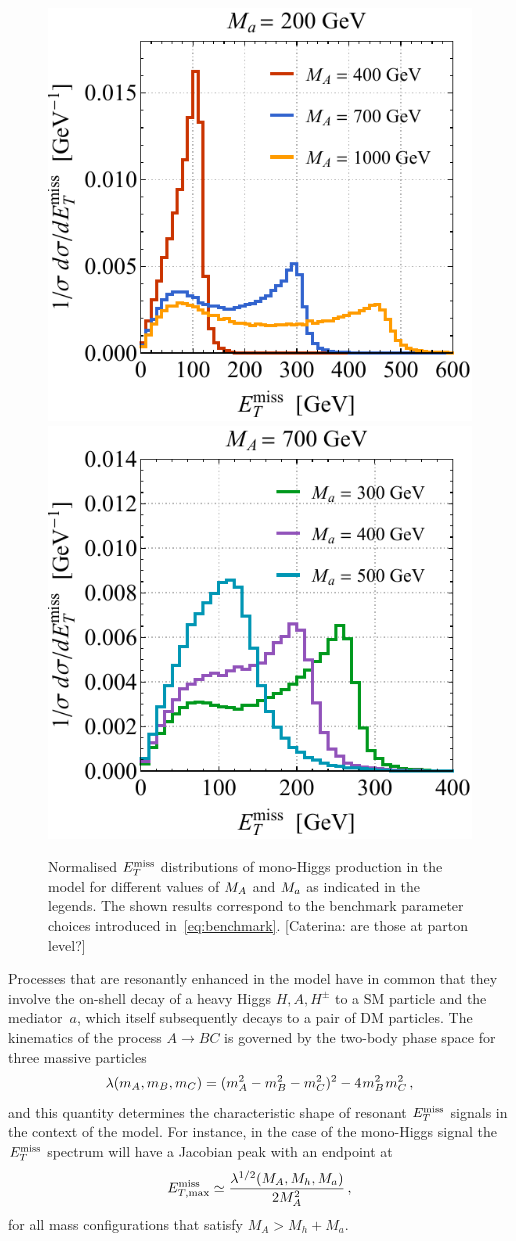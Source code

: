 \begin{figure}[t!]
\centering
\includegraphics[height=0.45\textwidth]{texinputs/04_grid/newfigures/hmetspecl.pdf}	\qquad 
\includegraphics[height=0.45\textwidth]{texinputs/04_grid/newfigures/hmetspecr.pdf}
\vspace{2mm}
\caption{\label{fig:hMET} Normalised $E_T^\mathrm{miss}$ distributions of mono-Higgs production in the \hdma model for different values of $M_{A}$ and $M_{a}$ as indicated in the legends. The shown results correspond to the benchmark parameter choices introduced in~\eqref{eq:benchmark}. \color{red}[Caterina: are those at parton level?]\color{black}
}  
\end{figure}

Processes that are resonantly enhanced in the \hdma model have in common that they involve the on-shell decay of a heavy Higgs $H,A,H^\pm$ to a SM particle and the mediator~$a$, which   itself  subsequently decays to a pair of DM particles. The kinematics of the process $A \to B C$ is governed by the two-body phase space for three massive particles 
\begin{equation} \label{eq:twophasespace}
\lambda(m_A, m_B, m_C) = (m_A^2 -m_B^2-m_C^2)^2 -  4 \hspace{0.25mm} m_B^2 \hspace{0.25mm}  m_C^2 \,,
\end{equation}
and this quantity determines the characteristic shape of resonant $E_T^\mathrm{miss}$ signals in the context of the \hdma model. For instance, in the case of the mono-Higgs signal the $E_T^\mathrm{miss}$ spectrum  will have a Jacobian peak with an endpoint at~\cite{No:2015xqa,Bauer:2017ota}
\begin{equation} \label{eq:monoHMETpeak}
E^{\rm{miss}}_{T, {\rm max} } \simeq \frac{\lambda^{1/2}(M_A, M_h, M_a)}{2 M_A^2}\,, 
\end{equation}
for all mass configurations that satisfy $M_A > M_h + M_a$. 

